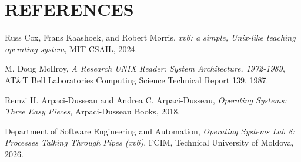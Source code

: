 \documentclass[12pt,a4paper]{report}
\numberwithin{equation}{chapter}
\numberwithin{figure}{chapter}
\numberwithin{table}{chapter}
\begin{document}
\chapter*{REFERENCES}

\noindent [1] Russ Cox, Frans Kaashoek, and Robert Morris, \textit{xv6: a simple, Unix-like teaching operating system}, MIT CSAIL, 2024.

\noindent [2] M. Doug McIlroy, \textit{A Research UNIX Reader: System Architecture, 1972-1989}, AT\&T Bell Laboratories Computing Science Technical Report 139, 1987.

\noindent [3] Remzi H. Arpaci-Dusseau and Andrea C. Arpaci-Dusseau, \textit{Operating Systems: Three Easy Pieces}, Arpaci-Dusseau Books, 2018.

\noindent [4] Department of Software Engineering and Automation, \textit{Operating Systems Lab 8: Processes Talking Through Pipes (xv6)}, FCIM, Technical University of Moldova, 2026.
\end{document}
